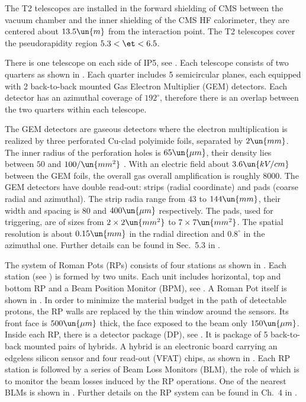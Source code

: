 
The T2 telescopes are installed in the forward shielding of CMS between the vacuum chamber and the inner shielding of the CMS HF calorimeter, they are centered about $13.5\un{m}$ from the interaction point. The T2 telescopes cover the pseudorapidity region $5.3 < \et < 6.5$.

There is one telescope on each side of IP5, see . Each telescope consists of two quarters as shown in . Each quarter includes 5 semicircular planes, each equipped with 2 back-to-back mounted Gas Electron Multiplier (GEM) detectors. Each detector has an azimuthal coverage of $192^\circ$, therefore there is an overlap between the two quarters within each telescope.

The GEM detectors are gaseous detectors where the electron multiplication is realized by three perforated Cu-clad polyimide foils, separated by $2\un{mm}$. The inner radius of the perforation holes is $65\un{\mu m}$, their density lies between $50$ and $100/\un{mm^2}$ . With an electric field about $3.6 \un{kV/cm}$ between the GEM foils, the overall gas overall amplification is roughly $8000$. The GEM detectors have double read-out: strips (radial coordinate) and pads (coarse radial and azimuthal). The strip radia range from $43$ to $144\un{mm}$, their width and spacing is $80$ and $400\un{\mu m}$ respectively. The pads, used for triggering, are of sizes from $2\times 2\un{mm^2}$ to $7\times 7\un{mm^2}$. The spatial resolution is about $0.15\un{mm}$ in the radial direction and $0.8^\circ$ in the azimuthal one. Further details can be found in Sec.~5.3 in .



\bmfig
{}
\emfig



The system of Roman Pots (RPs) consists of four stations as shown in . Each station (see ) is formed by two units. Each unit includes horizontal, top and bottom RP and a Beam Position Monitor (BPM), see . A Roman Pot itself is shown in . In order to minimize the material budget in the path of detectable protons, the RP walls are replaced by the thin window around the sensors. Its front face is $500\un{\mu m}$ thick, the face exposed to the beam only $150\un{\mu m}$. Inside each RP, there is a detector package (DP), see . It is package of 5 back-to-back mounted pairs of hybrids. A hybrid is an electronic board carrying an edgeless silicon sensor and four read-out (VFAT) chips, as shown in . Each RP station is followed by a series of Beam Loss Monitors (BLM), the role of which is to monitor the beam losses induced by the RP operations. One of the nearest BLMs is shown in . Further details on the RP system can be found in Ch.~4 in .

